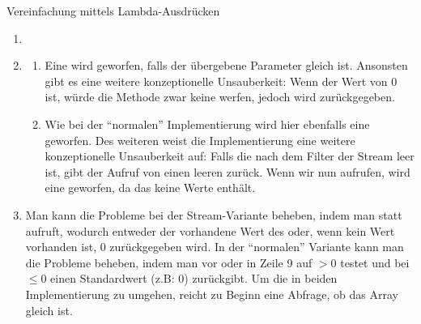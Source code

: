 \documentclass{../tuda-exercise}
\begin{document}
\begin{task}[credit = \stars{1}{3}]{Vereinfachung mittels Lambda-Ausdrücken}
    \begin{solution}
      \begin{enumerate}
        \item\hfill
        
        \item
        \begin{enumerate}
          [label = (\alph*)]
          \item Eine  wird geworfen, falls der übergebene
          Parameter gleich  ist. Ansonsten gibt es eine weitere konzeptionelle
          Unsauberkeit: Wenn der Wert von  0 ist, würde die Methode zwar keine
           werfen, jedoch wird
          \href{https://docs.oracle.com/en/java/javase/11/docs/api/java.base/java/lang/Double.html#NaN}
          {} zurückgegeben.
          \item Wie bei der \enquote{normalen} Implementierung wird hier ebenfalls eine
           geworfen. Des weiteren weist die Implementierung eine
          weitere konzeptionelle Unsauberkeit auf: Falls die nach dem Filter der Stream leer ist,
          gibt der Aufruf von  einen leeren
          \href{https://docs.oracle.com/en/java/javase/11/docs/api/java.base/java/util/OptionalDouble.html}
          {} zurück. Wenn wir nun  aufrufen,
          wird eine  geworfen, da das
           keine Werte enthält.
        \end{enumerate}
        \item Man kann die Probleme bei der Stream-Variante beheben, indem man statt
        \href{https://docs.oracle.com/en/java/javase/11/docs/api/java.base/java/util/OptionalDouble.html#orElse(double)}
        {} aufruft, wodurch entweder der vorhandene Wert des
         oder, wenn kein Wert vorhanden ist, 0 zurückgegeben wird. In
        der \enquote{normalen} Variante kann man die Probleme beheben, indem man vor oder in
        Zeile 9 auf  \(> 0\) testet und bei   \(\leq 0\)
        einen Standardwert (z.B: \(0\)) zurückgibt. Um die  in
        beiden Implementierung zu umgehen, reicht zu Beginn eine Abfrage, ob das Array gleich
         ist.
      \end{enumerate}
    \end{solution}
  \end{task}
\end{document}
